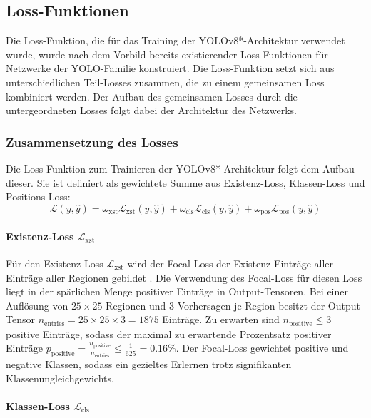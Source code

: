 
\subsection{Loss-Funktionen}
\label{sec:losses}

Die Loss-Funktion, die für das Training der YOLOv8*-Architektur verwendet wurde, wurde nach dem Vorbild bereits existierender Loss-Funktionen für Netzwerke der YOLO-Familie konstruiert. Die Loss-Funktion setzt sich aus unterschiedlichen Teil-Losses zusammen, die zu einem gemeinsamen Loss kombiniert werden. Der Aufbau des gemeinsamen Losses durch die untergeordneten Losses folgt dabei der Architektur des Netzwerks.

\subsubsection{Zusammensetzung des Losses}

Die Loss-Funktion zum Trainieren der YOLOv8*-Architektur folgt dem Aufbau dieser. Sie ist definiert als gewichtete Summe aus Existenz-Loss, Klassen-Loss und Positions-Loss:
\[ \mathcal{L}(y, \hat{y}) = \omega_\text{xst} \mathcal{L}_\text{xst}(y, \hat{y}) + \omega_\text{cls} \mathcal{L}_\text{cls}(y, \hat{y}) + \omega_\text{pos} \mathcal{L}_\text{pos}(y, \hat{y}) \]
\paragraph{Existenz-Loss $\mathcal{L}_\text{xst}$}

Für den Existenz-Loss $\mathcal{L}_\text{xst}$ wird der Focal-Loss der Existenz-Einträge aller Einträge aller Regionen gebildet \cite{focal_loss}. Die Verwendung des Focal-Loss für diesen Loss liegt in der spärlichen Menge positiver Einträge in Output-Tensoren. Bei einer Auflösung von $25 \times 25$ Regionen und 3 Vorhersagen je Region besitzt der Output-Tensor $n_\text{entries} = 25 \times 25 \times 3 = 1875$ Einträge. Zu erwarten sind $ n_\text{positive} \leq 3 $ positive Einträge, sodass der maximal zu erwartende Prozentsatz positiver Einträge $p_\text{positive} = \frac{n_\text{positive}}{n_\text{entries}} \leq \frac{1}{625} = 0.16\% $. Der Focal-Loss gewichtet positive und negative Klassen, sodass ein gezieltes Erlernen trotz signifikanten Klassenungleichgewichts.

\paragraph{Klassen-Loss $\mathcal{L}_\text{cls}$}


